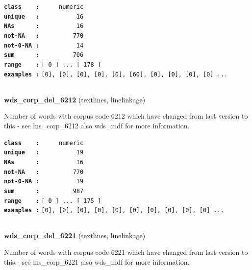 \documentclass[]{article}
\begin{document}
\textbf{\texttt{class\ \ \ \ :}} \texttt{~~~~~numeric}\\
\textbf{\texttt{unique\ \ \ :}} \texttt{~~~~~~~~~~16}\\
\textbf{\texttt{NAs\ \ \ \ \ \ :}} \texttt{~~~~~~~~~~16}\\
\textbf{\texttt{not-NA\ \ \ :}} \texttt{~~~~~~~~~770}\\
\textbf{\texttt{not-0-NA\ :}} \texttt{~~~~~~~~~~14}\\
\textbf{\texttt{sum\ \ \ \ \ \ :}} \texttt{~~~~~~~~~706}\\
\textbf{\texttt{range\ \ \ \ :}}
\texttt{{[}\ 0\ {]}\ ...\ {[}\ 178\ {]}}\\
\textbf{\texttt{examples\ :}}
\texttt{{[}0{]},\ {[}0{]},\ {[}0{]},\ {[}0{]},\ {[}0{]},\ {[}60{]},\ {[}0{]},\ {[}0{]},\ {[}0{]},\ {[}0{]}\ ...}\\

~

\textbf{wds\_corp\_del\_6212} (textlines, linelinkage)

Number of words with corpus code 6212 which have changed from last
version to this - see lns\_corp\_6212 also wds\_mdf for more
information.

\textbf{\texttt{class\ \ \ \ :}} \texttt{~~~~~numeric}\\
\textbf{\texttt{unique\ \ \ :}} \texttt{~~~~~~~~~~19}\\
\textbf{\texttt{NAs\ \ \ \ \ \ :}} \texttt{~~~~~~~~~~16}\\
\textbf{\texttt{not-NA\ \ \ :}} \texttt{~~~~~~~~~770}\\
\textbf{\texttt{not-0-NA\ :}} \texttt{~~~~~~~~~~19}\\
\textbf{\texttt{sum\ \ \ \ \ \ :}} \texttt{~~~~~~~~~987}\\
\textbf{\texttt{range\ \ \ \ :}}
\texttt{{[}\ 0\ {]}\ ...\ {[}\ 175\ {]}}\\
\textbf{\texttt{examples\ :}}
\texttt{{[}0{]},\ {[}0{]},\ {[}0{]},\ {[}0{]},\ {[}0{]},\ {[}0{]},\ {[}0{]},\ {[}0{]},\ {[}0{]},\ {[}0{]}\ ...}\\

~

\textbf{wds\_corp\_del\_6221} (textlines, linelinkage)

Number of words with corpus code 6221 which have changed from last
version to this - see lns\_corp\_6221 also wds\_mdf for more
information.
\end{document}
